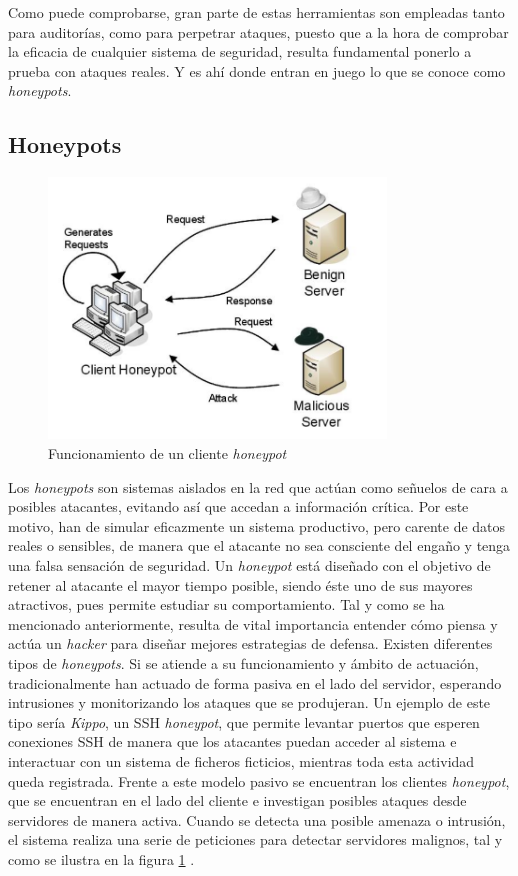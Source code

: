 Como puede comprobarse, gran parte de estas herramientas son empleadas tanto para auditorías, como para perpetrar ataques, puesto que a la hora de comprobar la eficacia de cualquier sistema de seguridad, resulta fundamental ponerlo a prueba con ataques reales. Y es ahí donde entran en juego lo que se conoce como \textit{honeypots}. 
\subsection{Honeypots}
\begin{figure}[t]
\centering
\includegraphics[width=0.8\textwidth]{images/clienthoneypot.png}
\caption{Funcionamiento de un cliente \textit{honeypot}}
\label{fig:clienthoneypot}
\end{figure}
Los \textit{honeypots} son sistemas aislados en la red que actúan como señuelos de cara a posibles atacantes, evitando así que accedan a información crítica. Por este motivo, han de simular eficazmente un sistema productivo, pero carente de datos reales o sensibles, de manera que el atacante no sea consciente del engaño y tenga una falsa sensación de seguridad. Un \textit{honeypot} está diseñado con el objetivo de retener al atacante el mayor tiempo posible, siendo éste uno de sus mayores atractivos, pues permite estudiar su comportamiento. Tal y como se ha mencionado anteriormente, resulta de vital importancia entender cómo piensa y actúa un \textit{hacker} para diseñar mejores estrategias de defensa\cite{Stallings2016}. Existen diferentes tipos de \textit{honeypots}. Si se atiende a su funcionamiento y ámbito de actuación, tradicionalmente han actuado de forma pasiva en el lado del servidor, esperando intrusiones y monitorizando los ataques que se produjeran. Un ejemplo de este tipo sería \textit{Kippo}, un SSH  \textit{honeypot}, que permite levantar puertos que esperen conexiones SSH de manera que los atacantes puedan acceder al sistema e interactuar con un sistema de ficheros ficticios, mientras toda esta actividad queda registrada\cite{THW}. Frente a este modelo pasivo se encuentran los clientes \textit{honeypot}, que se encuentran en el lado del cliente e investigan posibles ataques desde servidores de manera activa. Cuando se detecta una posible amenaza o intrusión, el sistema realiza una serie de peticiones para detectar servidores malignos, tal y como se ilustra en la figura \ref{fig:clienthoneypot} \cite{HoneynetProject}.     

